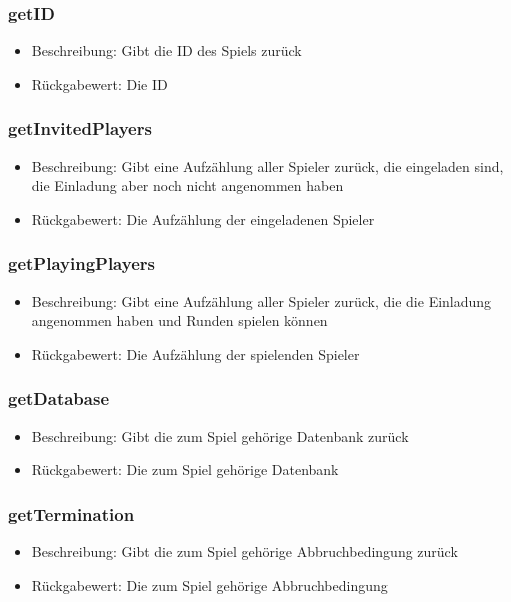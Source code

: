 \documentclass[a4paper]{scrreprt}
\begin{document}
	\subsubsection{getID}
		\begin{itemize}
		\item Beschreibung: Gibt die ID des Spiels zurück
		\item Rückgabewert: Die ID
		\end{itemize}
	\subsubsection{getInvitedPlayers}
		\begin{itemize}
			\item Beschreibung: Gibt eine Aufzählung aller Spieler zurück, die eingeladen sind, die Einladung aber noch nicht angenommen haben
			\item Rückgabewert: Die Aufzählung der eingeladenen Spieler
		\end{itemize}
	\subsubsection{getPlayingPlayers}
		\begin{itemize}
			\item Beschreibung: Gibt eine Aufzählung aller Spieler zurück, die die Einladung angenommen haben und Runden spielen können
			\item Rückgabewert: Die Aufzählung der spielenden Spieler
		\end{itemize}
	\subsubsection{getDatabase}
	\begin{itemize}
	\item Beschreibung: Gibt die zum Spiel gehörige Datenbank zurück
	\item Rückgabewert: Die zum Spiel gehörige Datenbank
	\end{itemize}
	\subsubsection{getTermination}
	\begin{itemize}
		\item Beschreibung: Gibt die zum Spiel gehörige Abbruchbedingung zurück
		\item Rückgabewert: Die zum Spiel gehörige Abbruchbedingung
		\end{itemize}
\end{document}
